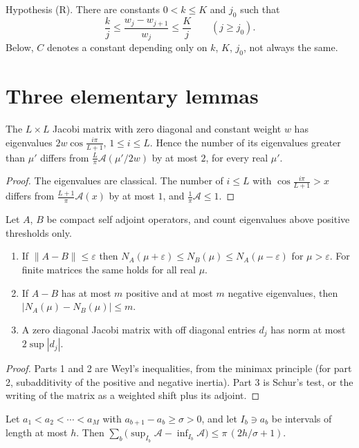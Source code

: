 \medskip
\noindent Hypothesis (R). There are constants $0<k\le K$ and $j_0$ such that
\[
\frac kj\le\frac{w_j-w_{j+1}}{w_j}\le\frac Kj\qquad(j\ge j_0).
\]
Below, $C$ denotes a constant depending only on $k$, $K$, $j_0$, not always the same.

\section{Three elementary lemmas}

\begin{lemma}\label{l:lem:const}
The $L\times L$ Jacobi matrix with zero diagonal and constant weight $w$ has eigenvalues $2w\cos\frac{i\pi}{L+1}$, $1\le i\le L$. Hence the number of its eigenvalues greater than $\mu'$ differs from $\frac L\pi\mathcal A(\mu'/2w)$ by at most $2$, for every real $\mu'$.
\end{lemma}

\begin{proof}
The eigenvalues are classical. The number of $i\le L$ with $\cos\frac{i\pi}{L+1}>x$ differs from $\frac{L+1}\pi\mathcal A(x)$ by at most $1$, and $\frac1\pi\mathcal A\le1$.
\end{proof}

\begin{lemma}[Perturbation]\label{l:lem:pert}
Let $A$, $B$ be compact self adjoint operators, and count eigenvalues above positive thresholds only.
\begin{enumerate}
\item If $\|A-B\|\le\varepsilon$ then $N_A(\mu+\varepsilon)\le N_B(\mu)\le N_A(\mu-\varepsilon)$ for $\mu>\varepsilon$. For finite matrices the same holds for all real $\mu$.
\item If $A-B$ has at most $m$ positive and at most $m$ negative eigenvalues, then $|N_A(\mu)-N_B(\mu)|\le m$.
\item A zero diagonal Jacobi matrix with off diagonal entries $d_j$ has norm at most $2\sup|d_j|$.
\end{enumerate}
\end{lemma}

\begin{proof}
Parts 1 and 2 are Weyl's inequalities, from the minimax principle (for part 2, subadditivity of the positive and negative inertia). Part 3 is Schur's test, or the writing of the matrix as a weighted shift plus its adjoint.
\end{proof}

\begin{lemma}[Overlap]\label{l:lem:overlap}
Let $a_1<a_2<\cdots<a_M$ with $a_{b+1}-a_b\ge\sigma>0$, and let $I_b\ni a_b$ be intervals of length at most $h$. Then $\sum_b\bigl(\sup_{I_b}\mathcal A-\inf_{I_b}\mathcal A\bigr)\le\pi\,(2h/\sigma+1)$.
\end{lemma}

